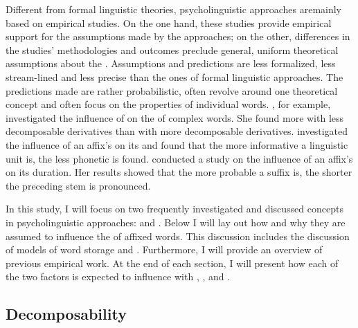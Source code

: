 Different from formal linguistic theories, psycholinguistic approaches are\linebreak mainly based on empirical studies. On the one hand, these studies provide empirical support for the assumptions made by the approaches; on the other, differences in the studies' methodologies and outcomes preclude general, uniform theoretical assumptions about the . Assumptions and predictions are less formalized, less stream-lined and less precise than the ones of formal linguistic approaches. The predictions made are rather probabilistic, often revolve around one theoretical concept and often focus on the properties of individual words. 
 \cite{Hay.2001,Hay.2003}, for example, investigated the influence of  on the  of complex words.  She found more  with less decomposable derivatives than with more decomposable derivatives. 
\cite{Pluymaekers.2010} investigated the influence of an affix's  on its  and found that the more informative a linguistic unit is, the less phonetic  is found. 
\cite{Cohen.2014} conducted a study on the influence of an affix's  on its duration. Her results showed that the more probable a suffix is, the shorter the preceding stem is pronounced.

In this study, I will focus on two frequently investigated and discussed concepts in psycholinguistic approaches:  and . Below I will lay out how and why they are assumed to influence the  of affixed words. This discussion includes the discussion of models of word storage and . Furthermore, I will provide an overview of previous empirical work.
 At the end of each section, I will present how each of the two factors is expected to influence  with , ,  and .

\subsection{Decomposability} \label{decomposability}

